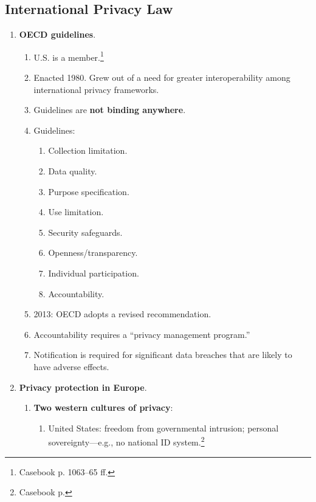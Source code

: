 \newpage

\subsection{International Privacy Law}

\begin{enumerate}
    \item \textbf{OECD guidelines}.
    \begin{enumerate}
        \item U.S. is a member.\footnote{Casebook p. 1063--65 ff.}
        \item Enacted 1980. Grew out of a need for greater interoperability 
        among international privacy frameworks.
        \item Guidelines are \textbf{not binding anywhere}.
        \item Guidelines:
        \begin{enumerate}
            \item Collection limitation.
            \item Data quality.
            \item Purpose specification.
            \item Use limitation.
            \item Security safeguards.
            \item Openness/transparency.
            \item Individual participation.
            \item Accountability.
        \end{enumerate}
        \item 2013: OECD adopts a revised recommendation.
        \item Accountability requires a ``privacy management program.''
        \item Notification is required for significant data breaches that are 
        likely to have adverse effects.
    \end{enumerate}
    \item \textbf{Privacy protection in Europe}.
    \begin{enumerate}
        \item \textbf{Two western cultures of privacy}:
        \begin{enumerate}
            \item United States: freedom from governmental intrusion; personal 
            sovereignty---e.g., no national ID system.\footnote{Casebook p. 
}
\end{enumerate}
\end{enumerate}
\end{enumerate}
